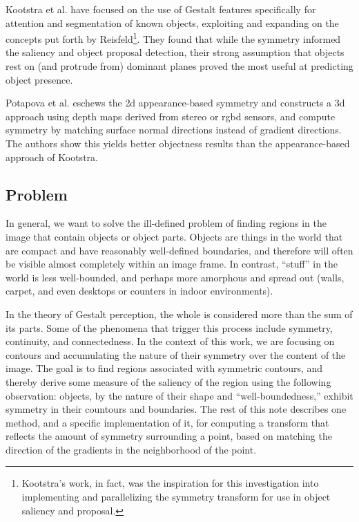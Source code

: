 Kootstra et al. have focused on the use of Gestalt features specifically for attention and segmentation of known objects\cite{kootstra_using_2010,kootstra_gestalt_2011}, exploiting and expanding on the concepts put forth by Reisfeld\footnote{Kootstra's work, in fact, was the inspiration for this investigation into implementing and parallelizing the symmetry transform for use in object saliency and proposal.}. They found that while the symmetry informed the saliency and object proposal detection, their strong assumption that objects rest on (and protrude from) dominant planes proved the most useful at predicting object presence. 

Potapova et al.\cite{potapova_local_2012} eschews the \gls{2d} appearance-based symmetry and constructs a \gls{3d} approach using depth maps derived from stereo or \gls{rgbd} sensors, and compute symmetry by matching surface normal directions instead of gradient directions. The authors show this yields better objectness results than the appearance-based approach of Kootstra.

\subsection{Problem}
\label{sec:problem}

In general, we want to solve the ill-defined problem of finding regions in the image that contain objects or object parts. Objects are things in the world that are compact and have reasonably well-defined boundaries, and therefore will often be visible almost completely within an image frame. In contrast, ``stuff'' in the world is less well-bounded, and perhaps more amorphous and spread out (\eg walls, carpet, and even desktops or counters in indoor environments).

In the theory of Gestalt perception, the whole is considered more than the sum of its parts\cite{jakel_overview_2016}. Some of the phenomena that trigger this process include symmetry, continuity, and connectedness. In the context of this work, we are focusing on contours and accumulating the nature of their symmetry over the content of the image. The goal is to find regions associated with symmetric contours, and thereby derive some measure of the saliency of the region using the following observation: objects, by the nature of their shape and ``well-boundedness,'' exhibit symmetry in their countours and boundaries. The rest of this note describes one method, and a specific implementation of it, for computing a transform that reflects the amount of symmetry surrounding a point, based on matching the direction of the gradients in the neighborhood of the point. 

